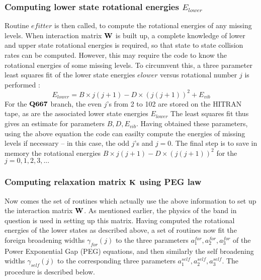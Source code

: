 \documentclass[11pt]{article}
\begin{document}
\subsubsection{Computing lower state rotational energies $E_{lower}$}
Routine $efitter$ is then called, to compute the rotational energies of any 
missing levels. When interaction matrix ${\bf W}$ is built up, a 
complete knowledge of lower and upper state rotational energies is required,
so that state to state collision rates can be computed. However, this
may require the code to know the rotational energies of some missing levels.
To circumvent this, a three parameter least squares fit of the lower
state energies $elower$ versus rotational number $j$ is performed : 
\[
E_{lower} = B \times j(j+1) - D \times (j(j+1))^{2} + E_{vib}
\]
For the ${\bf Q 667}$ branch, the even $j$'s from 2 to 102 are stored on the
HITRAN tape, as are the associated lower state energies $E_{lower}$
The least squares fit thus gives an estimate for parameters $B,D,E_{vib}$.
Having obtained these parameters, using the above equation the code can 
easilty compute the energies of missing levels if necessary -- in this 
case, the odd $j$'s and $j=0$. The final step is to save in memory the
rotational energies $B \times j(j+1) - D \times (j(j+1))^{2}$ for the 
$j=0,1,2,3,...$

\subsubsection{Computing relaxation matrix ${\bf K}$  using PEG law}
Now comes the set of routines which actually use the above information to 
set up the interaction matrix ${\bf W}$. As mentioned earlier, the physics
of the band in question is used in setting up this matrix. Having computed
the rotational energies of the lower states as described above, a set of 
routines now fit the foreign broadening widths $\gamma_{for}(j)$ to the 
three parameters $a_{1}^{for},a_{2}^{for},a_{3}^{for}$ of the Power 
Exponential Gap (PEG) equations, and then similarly the self broadening 
widths $\gamma_{self}(j)$ to the corresponding three  parameters 
$a_{1}^{self},a_{2}^{self},a_{3}^{self}$. The procedure is described below.
\end{document}
